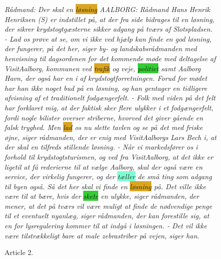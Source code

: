 \begin{figure}
	\begin{tcolorbox}
		\emph{
			Rådmand: Der skal   en \colorbox{Goldenrod}{løsning} AALBORG: Rådmand Hans Henrik Henriksen (S) er indstillet på, at der fra  side bidrages til en løsning, der sikrer krydstogtgæsterne sikker adgang på tværs af Slotspladsen. - Lad os prøve at se, om vi ikke ved  \colorbox{Peach}{hjælp} kan \colorbox{Peach}{finde} en god løsning, der fungerer, på det her, siger by- og landskabsrådmanden med henvisning til dagsordenen for det \colorbox{Peach}{kommende} \colorbox{Peach}{møde} med deltagelse af VisitAalborg, \colorbox{Peach}{kommunen} ved \colorbox{Goldenrod}{trafik} og veje, \colorbox{LimeGreen}{politiet} \colorbox{Peach}{samt} Aalborg Havn, der også har en  i  af krydstogtforretningen. Forud for mødet har han ikke noget bud på en løsning, og han gentager en tidligere afvisning af et traditionelt fodgængerfelt. - Folk med viden på det felt har forklaret mig, at der \colorbox{Peach}{faktisk} \colorbox{Peach}{sker} flere ulykker i et fodgængerfelt, fordi nogle bilister overser striberne, hvorved det \colorbox{Peach}{giver} gående en falsk tryghed. Men \colorbox{Goldenrod}{lad} os nu slette tavlen og se på det med friske øjne, siger rådmanden, der er enig med VisitAalborgs Lars Bech i, at der skal  en tilfreds stillende løsning. - Når vi markedsfører os i \colorbox{Peach}{forhold} til krydstogtsturismen, og ved fra VisitAalborg, at det ikke er ligetil at få rederierne til at vælge Aalborg, skal der også være en service, der virkelig fungerer, og der \colorbox{Aquamarine}{tæller} de små \colorbox{Peach}{ting} som adgang til \colorbox{Peach}{byen} også. Så det her skal vi \colorbox{Peach}{finde} en \colorbox{Goldenrod}{løsning} på. Det ville ikke være til at bære, hvis der \colorbox{LimeGreen}{skete} en ulykke, siger rådmanden, der mener, at det på tværs vil være \colorbox{Peach}{muligt} at \colorbox{Peach}{finde} de nødvendige \colorbox{Peach}{penge} til et eventuelt nyanlæg, siger rådmanden, der kan forestille sig, at en  for lysregulering kommer til at indgå i løsningen. - Det vil ikke være tilstrækkeligt bare at male zebrastriber på vejen, siger han.
		}
	\end{tcolorbox}
	\caption{Article 2.}
	\label{art:2}
\end{figure}
 
